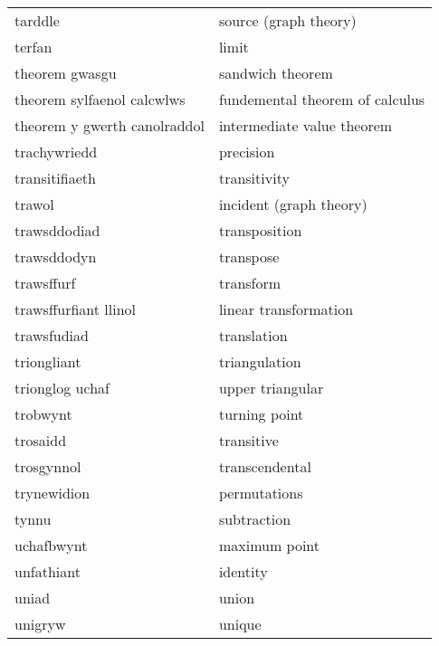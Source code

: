 \begin{supertabular}{p{0.22\textwidth}p{0.22\textwidth}}
                        tarddle &            source (graph theory) \\
                         terfan &                            limit \\
                 theorem gwasgu &                 sandwich theorem \\
     theorem sylfaenol calcwlws &  fundemental theorem of calculus \\
   theorem y gwerth canolraddol &       intermediate value theorem \\
                   trachywriedd &                        precision \\
                 transitifiaeth &                     transitivity \\
                         trawol &          incident (graph theory) \\
                   trawsddodiad &                    transposition \\
                    trawsddodyn &                        transpose \\
                     trawsffurf &                        transform \\
          trawsffurfiant llinol &            linear transformation \\
                    trawsfudiad &                      translation \\
                    triongliant &                    triangulation \\
                trionglog uchaf &                 upper triangular \\
                       trobwynt &                    turning point \\
                       trosaidd &                       transitive \\
                     trosgynnol &                   transcendental \\
                    trynewidion &                     permutations \\
                          tynnu &                      subtraction \\
                     uchafbwynt &                    maximum point \\
                     unfathiant &                         identity \\
                          uniad &                            union \\
                        unigryw &                           unique \\

\end{supertabular}

